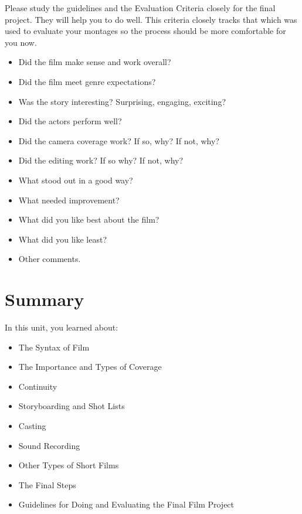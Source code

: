 \documentclass[
  letterpaper,
  DIV=11,
  numbers=noendperiod]{scrreprt}
\providecommand{\tightlist}{%
  \setlength{\itemsep}{0pt}\setlength{\parskip}{0pt}}\usepackage{longtable,booktabs,array}
\begin{document}
\begin{tcolorbox}[enhanced jigsaw, titlerule=0mm, opacitybacktitle=0.6, left=2mm, title={Learning Activity}, coltitle=black, colbacktitle=quarto-callout-note-color!10!white, toptitle=1mm, bottomtitle=1mm, colframe=quarto-callout-note-color-frame, colback=white, arc=.35mm, rightrule=.15mm, bottomrule=.15mm, toprule=.15mm, opacityback=0, breakable, leftrule=.75mm]

Please study the guidelines and the Evaluation Criteria closely for the
final project. They will help you to do well. This criteria closely
tracks that which was used to evaluate your montages so the process
should be more comfortable for you now.

\begin{itemize}
\tightlist
\item
  Did the film make sense and work overall?
\item
  Did the film meet genre expectations?
\item
  Was the story interesting? Surprising, engaging, exciting?
\item
  Did the actors perform well?
\item
  Did the camera coverage work? If so, why? If not, why?
\item
  Did the editing work? If so why? If not, why?
\item
  What stood out in a good way?
\item
  What needed improvement?
\item
  What did you like best about the film?
\item
  What did you like least?
\item
  Other comments.
\end{itemize}

\end{tcolorbox}

\section*{Summary}\label{summary-8}


In this unit, you learned about:

\begin{itemize}
\tightlist
\item
  The Syntax of Film
\item
  The Importance and Types of Coverage
\item
  Continuity
\item
  Storyboarding and Shot Lists
\item
  Casting
\item
  Sound Recording
\item
  Other Types of Short Films
\item
  The Final Steps
\item
  Guidelines for Doing and Evaluating the Final Film Project
\end{itemize}
\end{document}
